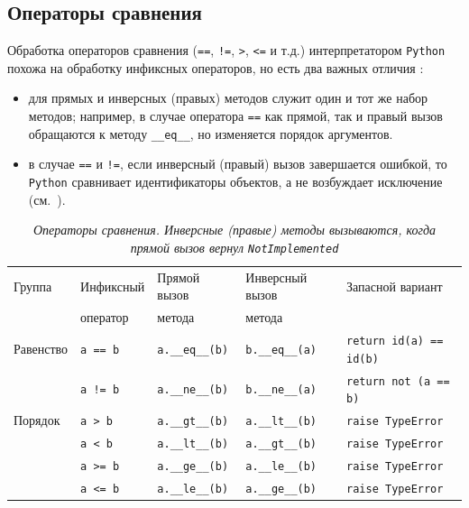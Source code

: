 \documentclass[%
	11pt,
	a4paper,
	utf8,
		]{article}
\begin{document}

\subsection{Операторы сравнения}

Обработка операторов сравнения (\texttt{==}, \texttt{!=}, \texttt{>}, \texttt{<=} и т.д.) интерпретатором \texttt{Python} похожа на обработку инфиксных операторов, но есть два важных отличия \cite[]{ramalho:python-2016}:

\begin{itemize}
	\item для прямых и инверсных (правых) методов служит один и тот же набор методов; например, в случае оператора \texttt{==} как прямой, так и правый вызов обращаются к методу \texttt{\_\_eq\_\_}, но изменяется порядок аргументов.
	
	\item в случае \texttt{==} и \texttt{!=}, если инверсный (правый) вызов завершается ошибкой, то \texttt{Python} сравнивает идентификаторы объектов, а не возбуждает исключение (см.~).
\end{itemize}

\begin{table}[h]
	\centering
	\caption{\itshape Операторы сравнения. Инверсные (правые) методы вызываются, когда\\ прямой вызов вернул \texttt{NotImplemented}}\label{tab:operators_comp}
	\begin{tabular}{lllll}
		{Группа} & {Инфиксный} & Прямой вызов & Инверсный вызов & Запасной вариант \\
		{} & оператор & метода & метода & {} \\ \hline\hline
		Равенство & \texttt{a == b} & \texttt{a.\_\_eq\_\_(b)} & \texttt{b.\_\_eq\_\_(a)} & \texttt{return id(a) == id(b)} \\
		\rowcolor[gray]{0.96} {} & \texttt{a != b} & \texttt{a.\_\_ne\_\_(b)} & \texttt{b.\_\_ne\_\_(a)} & \texttt{return not (a == b)} \\
		\hline
		Порядок & \texttt{a > b} & \texttt{a.\_\_gt\_\_(b)} & \texttt{a.\_\_lt\_\_(b)} & \texttt{raise TypeError} \\
		\rowcolor[gray]{0.96} {} & \texttt{a < b} & \texttt{a.\_\_lt\_\_(b)} & \texttt{a.\_\_gt\_\_(b)} & \texttt{raise TypeError} \\
		{} & \texttt{a >= b} & \texttt{a.\_\_ge\_\_(b)} & \texttt{a.\_\_le\_\_(b)} & \texttt{raise TypeError} \\
		\rowcolor[gray]{0.96} {} & \texttt{a <= b} & \texttt{a.\_\_le\_\_(b)} & \texttt{a.\_\_ge\_\_(b)} & \texttt{raise TypeError}
	\end{tabular}
\end{table}
\end{document}

